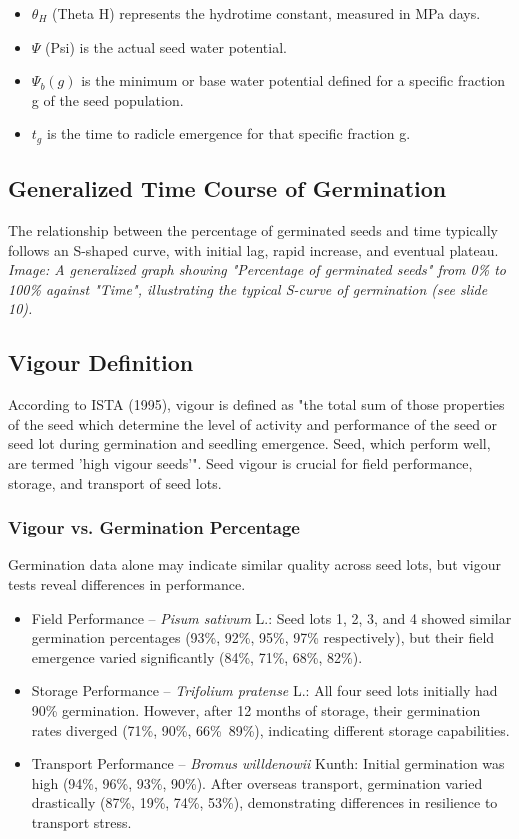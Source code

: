 \begin{itemize} 
    \item $\theta_H$ (Theta H) represents the hydrotime constant, measured in MPa days. 
    \item $\Psi$ (Psi) is the actual seed water potential. 
    \item $\Psi_b(g)$ is the minimum or base water potential defined for a specific fraction g of the seed population. 
    \item $t_g$ is the time to radicle emergence for that specific fraction g. 
\end{itemize}

\subsection{Generalized Time Course of Germination} 
The relationship between the percentage of germinated seeds and time typically follows an S-shaped curve, with initial lag, rapid increase, and eventual plateau. \textit{Image: A generalized graph showing "Percentage of germinated seeds" from 0\% to 100\% against "Time", illustrating the typical S-curve of germination (see slide 10).}

\subsection{Vigour Definition} 
According to ISTA (1995), vigour is defined as "the total sum of those properties of the seed which determine the level of activity and performance of the seed or seed lot during germination and seedling emergence. Seed, which perform well, are termed ’high vigour seeds’". Seed vigour is crucial for field performance, storage, and transport of seed lots.

\subsubsection{Vigour vs. Germination Percentage} 
Germination data alone may indicate similar quality across seed lots, but vigour tests reveal differences in performance. 

\begin{itemize} 
    \item Field Performance – \textit{Pisum sativum} L.: Seed lots 1, 2, 3, and 4 showed similar germination percentages (93\%, 92\%, 95\%, 97\% respectively), but their field emergence varied significantly (84\%, 71\%, 68\%, 82\%). 
    \item Storage Performance – \textit{Trifolium pratense} L.: All four seed lots initially had 90\% germination. However, after 12 months of storage, their germination rates diverged (71\%, 90\%, 66\%\, 89\%), indicating different storage capabilities. 
    \item Transport Performance – \textit{Bromus willdenowii} Kunth: Initial germination was high (94\%, 96\%, 93\%, 90\%). After overseas transport, germination varied drastically (87\%, 19\%, 74\%, 53\%), demonstrating differences in resilience to transport stress. 
\end{itemize}

